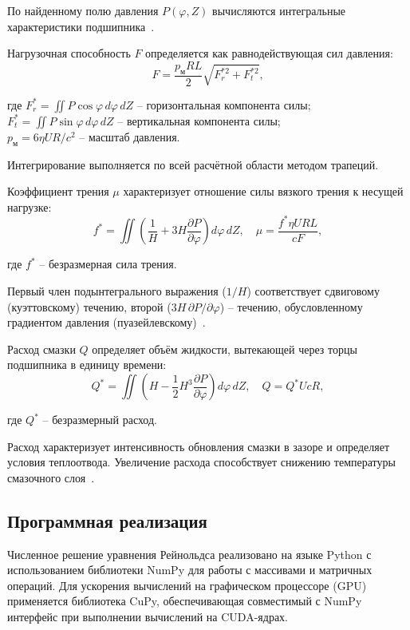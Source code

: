 По найденному полю давления $P(\varphi, Z)$ вычисляются интегральные характеристики подшипника~\cite{hamrock}.

Нагрузочная способность $F$ определяется как равнодействующая сил давления:
\begin{equation}
    F = \frac{p_{\text{м}} R L}{2} \sqrt{F_r^{*2} + F_t^{*2}},
\end{equation}

\noindent где $F_r^* = \iint P\cos\varphi\,d\varphi\,dZ$ -- горизонтальная компонента силы;\\
\hphantom{где }$F_t^* = \iint P\sin\varphi\,d\varphi\,dZ$ -- вертикальная компонента силы;\\
\hphantom{где }$p_{\text{м}} = 6\eta U R / c^2$ -- масштаб давления.

Интегрирование выполняется по всей расчётной области методом трапеций.

Коэффициент трения $\mu$ характеризует отношение силы вязкого трения к несущей нагрузке:
\begin{equation}
    f^* = \iint \left(\frac{1}{H} + 3H\frac{\partial P}{\partial\varphi}\right) d\varphi\,dZ, \quad
    \mu = \frac{f^* \eta U R L}{c F},
\end{equation}

\noindent где $f^*$ -- безразмерная сила трения.

Первый член подынтегрального выражения ($1/H$) соответствует сдвиговому (куэттовскому) течению, второй ($3H\,\partial P/\partial\varphi$) -- течению, обусловленному градиентом давления (пуазейлевскому)~\cite{pinkus}.

Расход смазки $Q$ определяет объём жидкости, вытекающей через торцы подшипника в единицу времени:
\begin{equation}
    Q^* = \iint \left(H - \frac{1}{2} H^3 \frac{\partial P}{\partial\varphi}\right) d\varphi\,dZ, \quad
    Q = Q^* U c R,
\end{equation}

\noindent где $Q^*$ -- безразмерный расход.

Расход характеризует интенсивность обновления смазки в зазоре и определяет условия теплоотвода. Увеличение расхода способствует снижению температуры смазочного слоя~\cite{hamrock}.

\subsection{Программная реализация}

Численное решение уравнения Рейнольдса реализовано на языке Python с использованием библиотеки NumPy для работы с массивами и матричных операций. Для ускорения вычислений на графическом процессоре (GPU) применяется библиотека CuPy, обеспечивающая совместимый с NumPy интерфейс при выполнении вычислений на CUDA-ядрах.

